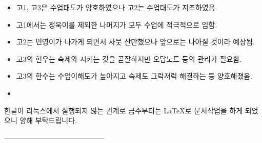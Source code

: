 \documentclass[idxtotoc,hyperref,openany]{labbook} %
\begin{document}

\begin{itemize}
	\item 고1, 고3은 수업태도가 양호하였으나 고2는 수업태도가 저조하였음.
	\item 고1에서는 정욱이를 제외한 나머지가 모두 수업에 적극적으로 임함.
	\item 고2는 민영이가 나가게 되면서 사뭇 산만했으나 앞으로는 나아질 것이라 예상됨.
	\item 고3의 현우는 숙제와 시키는 것을 곧잘하지만 오답노트 등의 관리가 필요함.
	\item 고3의 한수는 수업이해도가 높아지고 숙제도 그럭저럭 해결하는 등 양호해졌음.
	\item 
\end{itemize}

한글이 리눅스에서 실행되지 않는 관계로 금주부터는 LaTeX로 문서작업을 하게 되었으니 양해 부탁드립니다.




------------------------------------------










\end{document}
